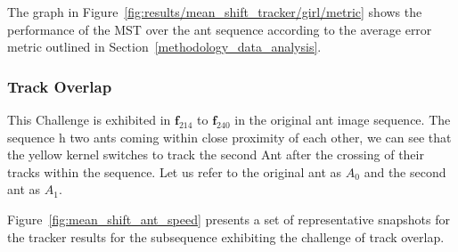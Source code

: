 The graph in Figure~\ref{fig:results/mean_shift_tracker/girl/metric} shows the
performance of the MST over the ant sequence according to the average error metric outlined in
Section~\ref{methodology_data_analysis}.  



\subsubsection{Track Overlap}\label{mean_shift_track_overlap}
This Challenge is exhibited in $\mathbf{f}_{214}$ to $\mathbf{f}_{240}$ in the
original ant image sequence. The sequence h two ants coming within close proximity of
each other, we can see that the yellow kernel switches to track the second Ant
after the crossing of their tracks within the sequence. Let us refer to the
original ant as $A_0$ and the second ant as $A_1$. 

Figure~\ref{fig:mean_shift_ant_speed} presents a set of representative snapshots
for the tracker results for the subsequence exhibiting the challenge of track
overlap.

